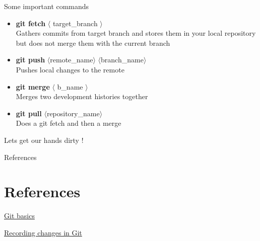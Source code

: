 \documentclass{beamer}
\begin{document}
\begin{frame}[allowframebreaks]{Some important commands}
\begin{adjustwidth}{-2em}{-2em}
\begin{itemize}
		\item {\textbf{git fetch }$\langle$ target\_branch $\rangle$ \\Gathers commits from target branch and stores them in your local repository but does not merge them with the current branch }
		\item {\textbf{git push} $\langle$remote\_name$\rangle$ $\langle$branch\_name$\rangle$\\Pushes local changes to the remote }
		\item {\textbf{git merge }$\langle$ b\_name $\rangle$ \\ Merges two development histories together}
		\item {\textbf{git pull }$\langle$repository\_name$\rangle$\\Does a git fetch and then a merge}
	\end{itemize}
\end{adjustwidth}
\end{frame}	

\begin{frame}
	\begin{center}
		\Huge Lets get our hands dirty !
	\end{center}
\end{frame}

\begin{frame}{References}
  \section{References}
    
  \begin{thebibliography}{10}

	\href{https://git-scm.com/book/en/v2/Getting-Started-Git-Basics}{Git basics}
	
	\href{https://git-scm.com/book/en/v2/Git-Basics-Recording-Changes-to-the-Repository}{Recording changes in Git}
	
	

  \end{thebibliography}
\end{frame}
\end{document}
